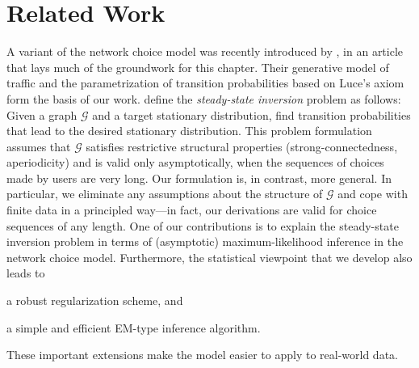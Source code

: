 \section{Related Work}  %
\label{cr:sec:relwork}

A variant of the network choice model was recently introduced by \citet{kumar2015inverting}, in an article that lays much of the groundwork for this chapter.
Their generative model of traffic and the parametrization of transition probabilities based on Luce's axiom form the basis of our work.
\citeauthor{kumar2015inverting} define the \emph{steady-state inversion} problem as follows:
Given a graph $\mathcal{G}$ and a target stationary distribution, find transition probabilities that lead to the desired stationary distribution.
This problem formulation assumes that $\mathcal{G}$ satisfies restrictive structural properties (strong-connectedness, aperiodicity) and is valid only asymptotically, when the sequences of choices made by users are very long.
Our formulation is, in contrast, more general.
In particular, we eliminate any assumptions about the structure of $\mathcal{G}$ and cope with finite data in a principled way---in fact, our derivations are valid for choice sequences of any length.
One of our contributions is to explain the steady-state inversion problem in terms of (asymptotic) maximum-likelihood inference in the network choice model.
Furthermore, the statistical viewpoint that we develop also leads to
\begin{enuminline}
\item a robust regularization scheme, and
\item a simple and efficient EM-type inference algorithm.
\end{enuminline}
These important extensions make the model easier to apply to real-world data.

